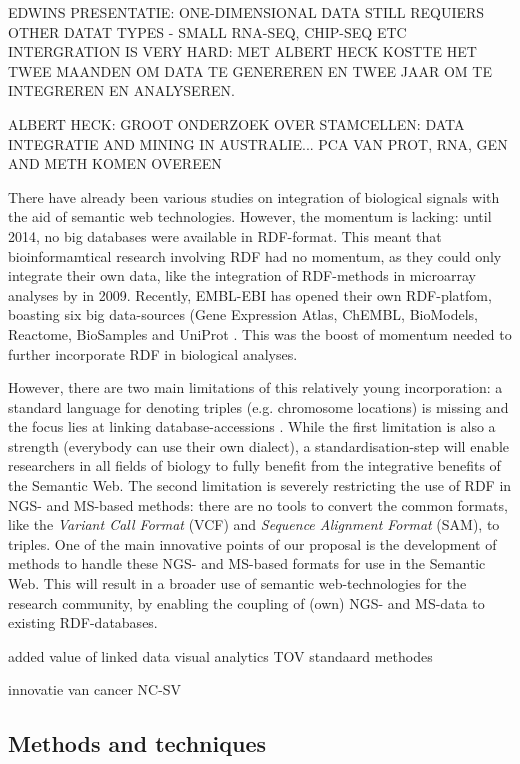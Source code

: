 \documentclass[twoside,fontsize=10pt]{article}
\begin{document}
EDWINS PRESENTATIE: ONE-DIMENSIONAL DATA STILL REQUIERS OTHER DATAT TYPES - SMALL RNA-SEQ, CHIP-SEQ ETC
INTERGRATION IS VERY HARD: MET ALBERT HECK KOSTTE HET TWEE MAANDEN OM DATA TE GENEREREN EN TWEE JAAR OM TE INTEGREREN EN ANALYSEREN.

ALBERT HECK: GROOT ONDERZOEK OVER STAMCELLEN: DATA INTEGRATIE AND MINING IN AUSTRALIE... PCA VAN PROT, RNA, GEN AND METH KOMEN OVEREEN



There have already been various studies on integration of biological signals with the aid of semantic web technologies. However, the momentum is lacking: until 2014, no big databases were available in RDF-format. This meant that bioinformamtical research involving RDF had no momentum, as they could only integrate their own data, like the integration of RDF-methods in microarray analyses by \citet{Szpakowski2009} in 2009. Recently, EMBL-EBI has opened their own RDF-platfom, boasting six big data-sources (Gene Expression Atlas, ChEMBL, BioModels, Reactome, BioSamples and UniProt \cite{Jupp2014}. This was the boost of momentum needed to further incorporate RDF in biological analyses.

However, there are two main limitations of this relatively young incorporation: a standard language for denoting triples (e.g. chromosome locations) is missing and the focus lies at linking database-accessions \citep{Ruttenberg2007}. While the first limitation is also a strength (everybody can use their own dialect), a standardisation-step will enable researchers in all fields of biology to fully benefit from the integrative benefits of the Semantic Web. The second limitation is  severely restricting the use of RDF in NGS- and MS-based methods: there are no tools to convert the common formats, like the \textit{Variant Call Format} (VCF) and \textit{Sequence Alignment Format} (SAM), to triples. One of the main innovative points of our proposal is the development of methods to handle these NGS- and MS-based formats for use in the Semantic Web. This will result in a broader use of semantic web-technologies for the research community, by enabling the coupling of (own) NGS- and MS-data to existing RDF-databases.
\medskip

\noindent
added value of linked data visual analytics TOV standaard methodes
\medskip

\noindent
innovatie van cancer NC-SV
\subsection*{Methods and techniques} %
\end{document}
